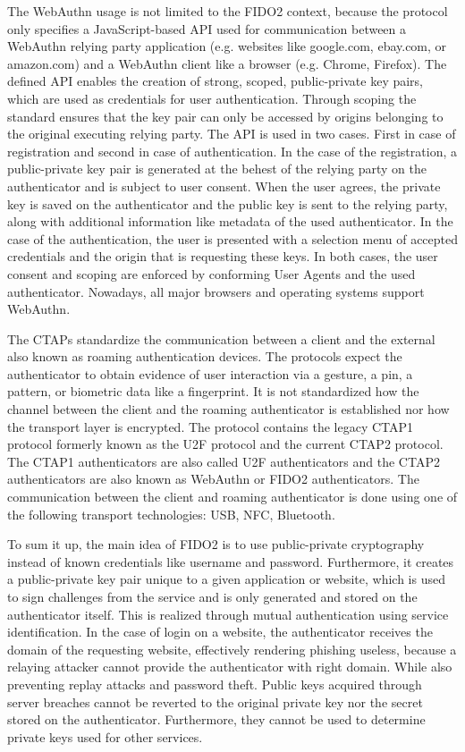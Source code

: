 \documentclass[runningheads]{llncs}
\begin{document}
The WebAuthn usage is not limited to the FIDO2 context, because the protocol only specifies a JavaScript-based API used for communication between a WebAuthn relying party application (e.g. websites like google.com, ebay.com, or amazon.com) and a WebAuthn client like a browser (e.g. Chrome, Firefox). The defined API enables the creation of strong, scoped, public-private key pairs, which are used as credentials for user authentication. Through scoping the standard ensures that the key pair can only be accessed by origins belonging to the original executing relying party. The API is used in two cases. First in case of registration and second in case of authentication. In the case of the registration, a public-private key pair is generated at the behest of the relying party on the authenticator and is subject to user consent. When the user agrees, the private key is saved on the authenticator and the public key is sent to the relying party, along with additional information like metadata of the used authenticator. In the case of the authentication, the user is presented with a selection menu of accepted credentials and the origin that is requesting these keys. In both cases, the user consent and scoping are enforced by conforming User Agents and the used authenticator.\cite{000002} Nowadays, all major browsers and operating systems support WebAuthn.\cite{000001}

The CTAPs standardize the communication between a client and the external also known as roaming authentication devices. The protocols expect the authenticator to obtain evidence of user interaction via a gesture, a pin, a pattern, or biometric data like a fingerprint. It is not standardized how the channel between the client and the roaming authenticator is established nor how the transport layer is encrypted. The protocol contains the legacy CTAP1 protocol formerly known as the U2F protocol and the current CTAP2 protocol. The CTAP1 authenticators are also called U2F authenticators and the CTAP2 authenticators are also known as WebAuthn or FIDO2 authenticators. The communication between the client and roaming authenticator is done using one of the following transport technologies: USB, NFC, Bluetooth. \cite{000003}\cite{274547}\cite{9099190}

To sum it up, the main idea of FIDO2 is to use public-private cryptography instead of known credentials like username and password. Furthermore, it creates a public-private key pair unique to a given application or website, which is used to sign challenges from the service and is only generated and stored on the authenticator itself. This is realized through mutual authentication using service identification. In the case of login on a website, the authenticator receives the domain of the requesting website, effectively rendering phishing useless, because a relaying attacker cannot provide the authenticator with right domain.\cite{274610} While also preventing replay attacks and password theft. Public keys acquired through server breaches cannot be reverted to the original private key nor the secret stored on the authenticator. Furthermore, they cannot be used to determine private keys used for other services.
\end{document}
